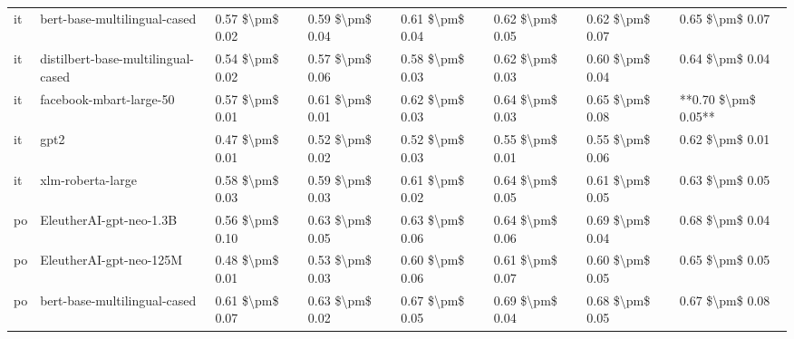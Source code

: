 \begin{tabular}{llllllll}
      it &       bert-base-multilingual-cased & 0.57 \$\textbackslash pm\$ 0.02 &           0.59 \$\textbackslash pm\$ 0.04 &       0.61 \$\textbackslash pm\$ 0.04 &        0.62 \$\textbackslash pm\$ 0.05 &                         0.62 \$\textbackslash pm\$ 0.07 &     0.65 \$\textbackslash pm\$ 0.07 \\
      it & distilbert-base-multilingual-cased & 0.54 \$\textbackslash pm\$ 0.02 &           0.57 \$\textbackslash pm\$ 0.06 &       0.58 \$\textbackslash pm\$ 0.03 &        0.62 \$\textbackslash pm\$ 0.03 &                         0.60 \$\textbackslash pm\$ 0.04 &     0.64 \$\textbackslash pm\$ 0.04 \\
      it &            facebook-mbart-large-50 & 0.57 \$\textbackslash pm\$ 0.01 &           0.61 \$\textbackslash pm\$ 0.01 &       0.62 \$\textbackslash pm\$ 0.03 &        0.64 \$\textbackslash pm\$ 0.03 &                         0.65 \$\textbackslash pm\$ 0.08 & **0.70 \$\textbackslash pm\$ 0.05** \\
      it &                               gpt2 & 0.47 \$\textbackslash pm\$ 0.01 &           0.52 \$\textbackslash pm\$ 0.02 &       0.52 \$\textbackslash pm\$ 0.03 &        0.55 \$\textbackslash pm\$ 0.01 &                         0.55 \$\textbackslash pm\$ 0.06 &     0.62 \$\textbackslash pm\$ 0.01 \\
      it &                  xlm-roberta-large & 0.58 \$\textbackslash pm\$ 0.03 &           0.59 \$\textbackslash pm\$ 0.03 &       0.61 \$\textbackslash pm\$ 0.02 &        0.64 \$\textbackslash pm\$ 0.05 &                         0.61 \$\textbackslash pm\$ 0.05 &     0.63 \$\textbackslash pm\$ 0.05 \\
      po &            EleutherAI-gpt-neo-1.3B & 0.56 \$\textbackslash pm\$ 0.10 &           0.63 \$\textbackslash pm\$ 0.05 &       0.63 \$\textbackslash pm\$ 0.06 &        0.64 \$\textbackslash pm\$ 0.06 &                         0.69 \$\textbackslash pm\$ 0.04 &     0.68 \$\textbackslash pm\$ 0.04 \\
      po &            EleutherAI-gpt-neo-125M & 0.48 \$\textbackslash pm\$ 0.01 &           0.53 \$\textbackslash pm\$ 0.03 &       0.60 \$\textbackslash pm\$ 0.06 &        0.61 \$\textbackslash pm\$ 0.07 &                         0.60 \$\textbackslash pm\$ 0.05 &     0.65 \$\textbackslash pm\$ 0.05 \\
      po &       bert-base-multilingual-cased & 0.61 \$\textbackslash pm\$ 0.07 &           0.63 \$\textbackslash pm\$ 0.02 &       0.67 \$\textbackslash pm\$ 0.05 &        0.69 \$\textbackslash pm\$ 0.04 &                         0.68 \$\textbackslash pm\$ 0.05 &     0.67 \$\textbackslash pm\$ 0.08 \\

\end{tabular}
